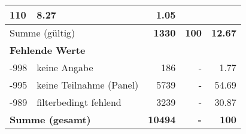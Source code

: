 \begin{longtable}{lXrrr}
       \num{110} &
       \num[round-mode=places,round-precision=2]{8.27} &
         \num[round-mode=places,round-precision=2]{1.05} \\
     \midrule
     \multicolumn{2}{l}{Summe (gültig)} &
       \textbf{\num{1330}} &
     \textbf{\num{100}} &
       \textbf{\num[round-mode=places,round-precision=2]{12.67}} \\
     \multicolumn{5}{l}{\textbf{Fehlende Werte}}\\
       -998 &
       keine Angabe &
         \num{186} &
        - &
         \num[round-mode=places,round-precision=2]{1.77} \\
       -995 &
       keine Teilnahme (Panel) &
         \num{5739} &
        - &
         \num[round-mode=places,round-precision=2]{54.69} \\
       -989 &
       filterbedingt fehlend &
         \num{3239} &
        - &
         \num[round-mode=places,round-precision=2]{30.87} \\
     \midrule
     \multicolumn{2}{l}{\textbf{Summe (gesamt)}} &
          \textbf{\num{10494}} &
        \textbf{-} &
        \textbf{\num{100}} \\
     \bottomrule
     \end{longtable}
     
